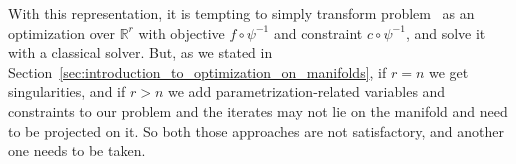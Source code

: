 With this representation, it is tempting to simply transform problem~ as an optimization over $\mathbb{R}^r$ with objective $f \circ \psi^{-1}$ and constraint $c \circ \psi^{-1}$, and solve it with a classical solver.
But, as we stated in Section~\ref{sec:introduction_to_optimization_on_manifolds}, if $r=n$ we get singularities, and if $r>n$ we add parametrization-related variables and constraints to our problem and the iterates may not lie on the manifold and need to be projected on it.
So both those approaches are not satisfactory, and another one needs to be taken.




